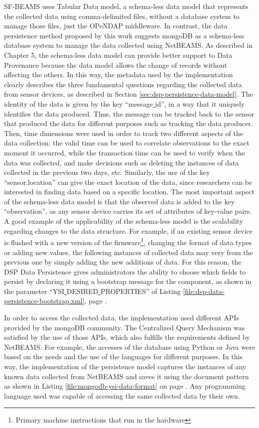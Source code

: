 SF-BEAMS uses Tabular Data model, a schema-less data model that represents the
collected data using comma-delimited files, without a database system to manage
those files, just the OPeNDAP middleware. In contrast, the data persistence
method proposed by this work suggests mongoDB as a schema-less database system
to manage the data collected using NetBEAMS. As described in Chapter 5, the
schema-less data model can provide better support to Data Provenance because
the data model allows the change of records without affecting the
others. In this way, the metadata used by the implementation clearly describes
the three fundamental questions regarding the collected data from sensor
devices, as described in Section \ref{sec:dsp-persistence-data-model}. The 
identity of the data is given by the key ``message\underline{ }id'', in a way
that it uniquely identifies the data produced. Thus, the message can be tracked
back to the sensor that produced the data for different purposes such as
tracking the data producer. Then, time dimensions were used in order to
track two different aspects of the data collection: the valid time can be used
to correlate observations to the exact moment it occurred, while the
transaction time can be used to verify when the data was collected, and make
decisions such as deleting the instances of data collected in the previous two
days, etc. Similarly, the use of the key ``sensor.location'' can give the exact
location of the data, since researchers can be interested in finding data
based on a specific location. The most important aspect of the schema-less data
model is that the observed data is added to the key ``observation'', as any
sensor device carries its set of attributes of key-value pairs. A good example
of the applicability of the schema-less model is the scalability regarding
changes to the data structure. For example, if an existing sensor device is
flushed with a new version of the firmware\footnote{Primary machine
instructions that run in the hardware}, changing the format of data types or
adding new values, the following instances of collected data may very
from the previous one by simply adding the new additions of data. For this
reason, the DSP Data Persistence gives administrators the ability to choose
which fields to persist by declaring it using a bootstrap message for the
component, as shown in the parameter ``YSI\underline{ }DESIRED\underline{
}PROPERTIES'' of Listing \ref{file:dsp-data-persistence-bootstrap.xml}, page
\pageref{file:dsp-data-persistence-bootstrap.xml}.

In order to access the collected data, the implementation used different APIs
provided by the mongoDB community. The Centralized Query Mechanism was
satisfied by the use of those APIs, which also fulfills the requirements
defined by NetBEAMS. For example, the accesses of the database using Python or
Java were based on the needs and the use of the languages for different
purposes. In this way, the implementation of the persistence model captures
the instances of any known data collected from NetBEAMS and saves it using the
document pattern as shown in Listing \ref{file:mongodb-ysi-data-format} on page
\pageref{file:mongodb-ysi-data-format}. Any programming language used was
capable of accessing the same collected data by their own. 

